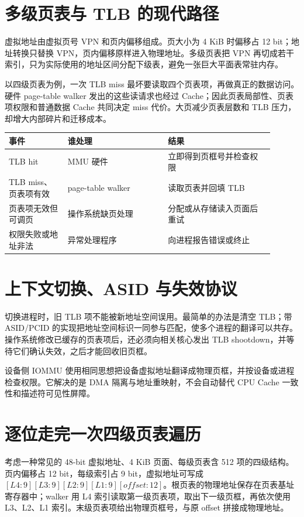 \section{多级页表与 TLB 的现代路径}

虚拟地址由虚拟页号 VPN 和页内偏移组成。页大小为 4 KiB 时偏移占 12 bit；地址转换只替换 VPN，页内偏移原样进入物理地址。多级页表把 VPN 再切成若干索引，只为实际使用的地址区间分配下级表，避免一张巨大平面表常驻内存。

以四级页表为例，一次 TLB miss 最坏要读取四个页表项，再做真正的数据访问。硬件 page-table walker 发出的这些读请求也经过 Cache；因此页表局部性、页表项权限和普通数据 Cache 共同决定 miss 代价。大页减少页表层数和 TLB 压力，却增大内部碎片和迁移成本。

\begin{longtable}{L{0.2\linewidth}L{0.34\linewidth}L{0.36\linewidth}}
\toprule
事件 & 谁处理 & 结果 \\
\midrule
TLB hit & MMU 硬件 & 立即得到页框号并检查权限 \\
TLB miss、页表项有效 & page-table walker & 读取页表并回填 TLB \\
页表项无效但可调页 & 操作系统缺页处理 & 分配或从存储读入页面后重试 \\
权限失败或地址非法 & 异常处理程序 & 向进程报告错误或终止 \\
\bottomrule
\end{longtable}

\section{上下文切换、ASID 与失效协议}

切换进程时，旧 TLB 项不能被新地址空间误用。最简单的办法是清空 TLB；带 ASID/PCID 的实现把地址空间标识一同参与匹配，使多个进程的翻译可以共存。操作系统修改已缓存的页表项后，还必须向相关核心发出 TLB shootdown，并等待它们确认失效，之后才能回收旧页框。

设备侧 IOMMU 使用相同思想把设备虚拟地址翻译成物理页框，并按设备或进程检查权限。它解决的是 DMA 隔离与地址重映射，不会自动替代 CPU Cache 一致性和描述符可见性屏障。

\section{逐位走完一次四级页表遍历}

考虑一种常见的 48-bit 虚拟地址、4 KiB 页面、每级页表含 512 项的四级结构。页内偏移占 12 bit，每级索引占 9 bit，虚拟地址可写成 $[L4:9][L3:9][L2:9][L1:9][offset:12]$。根页表的物理地址保存在页表基址寄存器中；walker 用 L4 索引读取第一级页表项，取出下一级页框，再依次使用 L3、L2、L1 索引。末级页表项给出物理页框号，与原 offset 拼接成物理地址。

